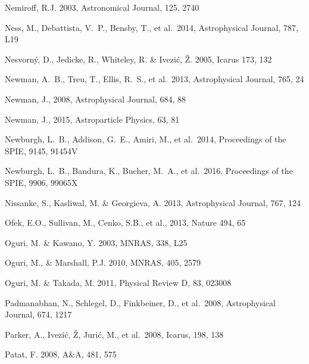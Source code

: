 \documentclass[twocolumn]{aastex61}
\begin{document}
\begin{thebibliography}{}
 Nemiroff, R.J. 2003, Astronomical Journal, 125, 2740

 Ness, M., Debattista, V.~P., Bensby, T., et al.~2014, Astrophysical Journal, 787, L19

 Nesvorn\'{y}, D., Jedicke, R., Whiteley, R. \& Ivezi\'{c}, \v{Z}. 2005, Icarus 173, 132

 Newman, A.~B., Treu, T., Ellis, R.~S., et al.\ 2013, Astrophysical Journal, 765, 24

 Newman, J., 2008, Astrophysical Journal, 684, 88

 Newman, J., 2015, Astroparticle Physics, 63, 81

 Newburgh, L.~B., Addison, G.~E., Amiri, M., et al.~2014, Proceedings of the SPIE, 9145, 91454V

 Newburgh, L.~B., Bandura, K., Bucher, M.~A., et al.~2016, Proceedings of the SPIE, 9906, 99065X

 Nissanke, S., Kasliwal, M. \& Georgieva, A. 2013,  Astrophysical Journal, 767, 124

 Ofek, E.O.,  Sullivan, M., Cenko, S.B., et al., 2013, Nature 494, 65

 Oguri, M. \& Kawano, Y. 2003, MNRAS, 338, L25

 Oguri, M., \& Marshall, P.J. 2010, MNRAS, 405, 2579

 Oguri, M. \& Takada, M. 2011, Physical Review D, 83, 023008

 Padmanabhan, N., Schlegel, D., Finkbeiner, D., et al.~2008, Astrophysical Journal, 674, 1217

 Parker, A., Ivezi\'{c}, \v{Z}, Juri\'{c}, M., et al.~2008, Icarus, 198, 138

 Patat, F. 2008, A\&A, 481, 575


\end{thebibliography}
\end{document}
